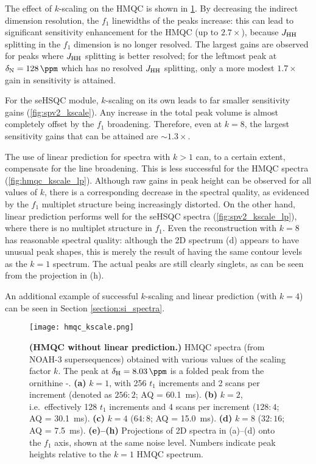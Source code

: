 The effect of $k$-scaling on the HMQC is shown in \cref{fig:hmqc_kscale}.
By decreasing the indirect dimension resolution, the $f_1$ linewidths of the peaks increase: this can lead to significant sensitivity enhancement for the HMQC (up to $2.7 \times$), because $\jhh$ splitting in the $f_1$ dimension is no longer resolved.
The largest gains are observed for peaks where $\jhh$ splitting is better resolved; for the leftmost peak at $\delta_{\ce{N}} = \SI{128}{\ppm}$ which has no resolved $\jhh$ splitting, only a more modest $1.7 \times$ gain in sensitivity is attained.

For the seHSQC module, $k$-scaling on its own leads to far smaller sensitivity gains (\cref{fig:spv2_kscale}).
Any increase in the total peak volume is almost completely offset by the $f_1$ broadening.
Therefore, even at $k = 8$, the largest sensitivity gains that can be attained are $\sim 1.3\times$.

The use of linear prediction for spectra with $k > 1$ can, to a certain extent, compensate for the line broadening.
This is less successful for the HMQC spectra (\cref{fig:hmqc_kscale_lp}).
Although raw gains in peak height can be observed for all values of $k$, there is a corresponding decrease in the spectral quality, as evidenced by the $f_1$ multiplet structure being increasingly distorted.
On the other hand, linear prediction performs well for the seHSQC spectra (\cref{fig:spv2_kscale_lp}), where there is no multiplet structure in $f_1$.
Even the reconstruction with $k = 8$ has reasonable spectral quality: although the 2D spectrum (d) appears to have unusual peak shapes, this is merely the result of having the same contour levels as the $k = 1$ spectrum.
The actual peaks are still clearly singlets, as can be seen from the projection in (h).

An additional example of successful $k$-scaling and linear prediction (with $k = 4$) can be seen in Section \ref{section:si_spectra}.

\begin{figure}
    \centering
    \texttt{[image: hmqc\_kscale.png]}
    \caption{
        \textbf{(HMQC without linear prediction.)}
        \nitrogen{} HMQC spectra (from NOAH-3  supersequences) obtained with various values of the scaling factor $k$.
        The peak at $\delta_{\ce{H}} = \SI{8.03}{\ppm}$ is a folded peak from the ornithine \textdelta-.
        \textbf{(a)} $k = 1$, with 256 $t_1$ increments and 2 scans per increment (denoted as $256:2$; AQ = \SI{60.1}{\ms}).
        \textbf{(b)} $k = 2$, i.e.\ effectively 128 $t_1$ increments and 4 scans per increment ($128:4$; AQ = \SI{30.1}{\ms}).
        \textbf{(c)} $k = 4$ ($64:8$; AQ = \SI{15.0}{\ms}).
        \textbf{(d)} $k = 8$ ($32:16$; AQ = \SI{7.5}{\ms}).
        \textbf{(e)--(h)} Projections of 2D spectra in (a)--(d) onto the $f_1$ axis, shown at the same noise level.
        Numbers indicate peak heights relative to the $k = 1$ HMQC spectrum.
        \grami{}
    }
    \label{fig:hmqc_kscale}
\end{figure}

